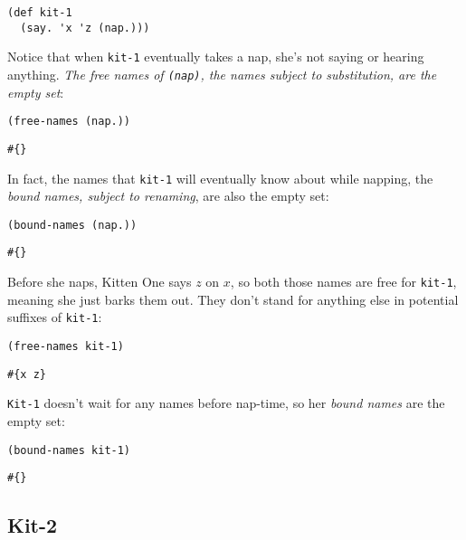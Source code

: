\documentclass[10pt,oneside,x11names]{article}
\theoremstyle{definition}
\theoremstyle{warning}
\begin{document}
\vskip 0.26cm
\begin{verbatim}
(def kit-1
  (say. 'x 'z (nap.)))
\end{verbatim}

Notice that when \texttt{kit-1} eventually takes a nap, she's not
saying or hearing anything. \emph{The free names of \texttt{(nap)}, the
names subject to substitution, are the empty set}:

\vskip 0.26cm
\begin{verbatim}
(free-names (nap.))
\end{verbatim}

\begin{verbatim}
#{}
\end{verbatim}


In fact, the names that \texttt{kit-1} will eventually know about while
napping, the \emph{bound names, subject to renaming}, are also the
empty set:

\vskip 0.26cm
\begin{verbatim}
(bound-names (nap.))
\end{verbatim}

\begin{verbatim}
#{}
\end{verbatim}


Before she naps, Kitten One says \(z\) on \(x\), so both those names
are free for \texttt{kit-1}, meaning she just barks them out. They don't
stand for anything else in potential suffixes of \texttt{kit-1}:

\vskip 0.26cm
\begin{verbatim}
(free-names kit-1)
\end{verbatim}

\begin{verbatim}
#{x z}
\end{verbatim}


\texttt{Kit-1} doesn't wait for any names before nap-time, so her
\emph{bound names} are the empty set:

\vskip 0.26cm
\begin{verbatim}
(bound-names kit-1)
\end{verbatim}

\begin{verbatim}
#{}
\end{verbatim}

\subsection{Kit-2}
\label{sec:org62a70e7}
\end{document}
